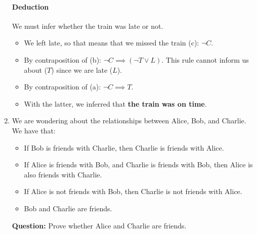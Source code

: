 \documentclass[11pt]{article}
\numberwithin{equation}{section}
\newcommand{\sol}[1]{
    }
\begin{document}
\begin{enumerate}
{        \paragraph{Deduction}
        We must infer whether the train was late or not.
        \begin{itemize}
            \item We left late, so that means that we missed the train (c): $\neg C$.
            \item By contraposition of (b): $\neg C \implies (\neg T \lor L)$. This rule cannot inform us about ($T$) since we are late ($L$).
            \item By contraposition of (a): $\neg C \implies T$.
            \item With the latter, we inferred that \textbf{the train was on time}.
        \end{itemize}
    }

    \item We are wondering about the relationships between Alice, Bob, and Charlie. We have that:
    \begin{itemize}
        \item If Bob is friends with Charlie, then Charlie is friends with Alice.
        \item If Alice is friends with Bob, and Charlie is friends with Bob, then Alice is also friends with Charlie.
        \item If Alice is not friends with Bob, then Charlie is not friends with Alice.
        \item Bob and Charlie are friends.
    \end{itemize}
    \textbf{Question:} Prove whether Alice and Charlie are friends.
    
    \sol{
        \paragraph{Notations}
        \begin{itemize}
            \item Alice is friends with Bob: $A_B$.
            \item Alice is friends with Charlie: $A_C$.
            \item Bob is friends with Alice: $B_A$.
            \item Bob is friends with Charlie: $B_C$.
            \item Charlie is friends with Alice: $C_A$.
            \item Charlie is friends with Bob: $C_B$.
        \end{itemize}

}
\end{enumerate}
\end{document}
